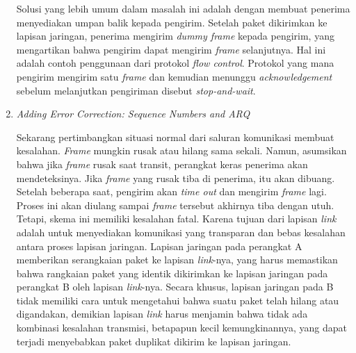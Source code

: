 \begin{enumerate}
  Solusi yang lebih umum dalam masalah ini adalah dengan membuat penerima menyediakan umpan balik kepada pengirim. Setelah paket dikirimkan ke lapisan jaringan, penerima mengirim \emph{dummy frame} kepada pengirim, yang mengartikan bahwa pengirim dapat mengirim \emph{frame} selanjutnya. Hal ini adalah contoh penggunaan dari protokol \emph{flow control}. Protokol yang mana pengirim mengirim satu \emph{frame} dan kemudian menunggu \emph{acknowledgement} sebelum melanjutkan pengiriman disebut \emph{stop-and-wait}.

  \item{\emph{Adding Error Correction: Sequence Numbers and ARQ}}

  Sekarang pertimbangkan situasi normal dari saluran komunikasi membuat kesalahan. \emph{Frame} mungkin rusak atau hilang sama sekali. Namun, asumsikan bahwa jika \emph{frame} rusak saat transit, perangkat keras penerima akan mendeteksinya. Jika \emph{frame} yang rusak tiba di penerima, itu akan dibuang. Setelah beberapa saat, pengirim akan \emph{time out} dan mengirim \emph{frame} lagi. Proses ini akan diulang sampai \emph{frame} tersebut akhirnya tiba dengan utuh. Tetapi, skema ini memiliki kesalahan fatal. Karena tujuan dari lapisan \emph{link} adalah untuk menyediakan komunikasi yang transparan dan bebas kesalahan antara proses lapisan jaringan. Lapisan jaringan pada perangkat A memberikan serangkaian paket ke lapisan \emph{link}-nya, yang harus memastikan bahwa rangkaian paket yang identik dikirimkan ke lapisan jaringan pada perangkat B oleh lapisan \emph{link}-nya. Secara khusus, lapisan jaringan pada B tidak memiliki cara untuk mengetahui bahwa suatu paket telah hilang atau digandakan, demikian lapisan \emph{link} harus menjamin bahwa tidak ada kombinasi kesalahan transmisi, betapapun kecil kemungkinannya, yang dapat terjadi menyebabkan paket duplikat dikirim ke lapisan jaringan.


\end{enumerate}
